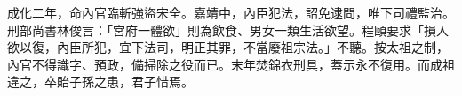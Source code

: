 成化二年，命內官臨斬強盜宋全。嘉靖中，內臣犯法，詔免逮問，唯下司禮監治。刑部尚書林俊言：「宮府一體欲」則為飲食、男女一類生活欲望。程頤要求「損人欲以復，內臣所犯，宜下法司，明正其罪，不當廢祖宗法。」不聽。按太祖之制，內官不得識字、預政，備掃除之役而已。末年焚錦衣刑具，蓋示永不復用。而成祖違之，卒貽子孫之患，君子惜焉。
